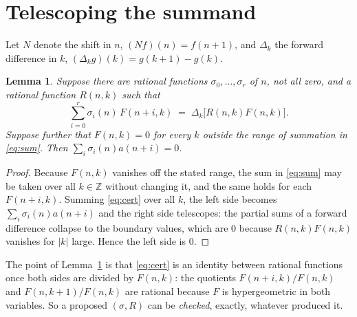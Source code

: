 \documentclass[11pt,a4paper]{article}
\theoremstyle{plain}
\newtheorem{lemma}[theorem]{Lemma}
\theoremstyle{definition}
\begin{document}
\section{Telescoping the summand}

Let $N$ denote the shift in $n$, $(Nf)(n)=f(n+1)$, and $\Delta_{k}$ the forward difference
in $k$, $(\Delta_{k}g)(k)=g(k+1)-g(k)$.

\begin{lemma}\label{lem:tel}
Suppose there are rational functions $\sigma_{0},\dots,\sigma_{r}$ of $n$, not all zero,
and a rational function $R(n,k)$ such that
\begin{equation}\label{eq:cert}
\sum_{i=0}^{r}\sigma_{i}(n)\,F(n+i,k)\;=\;\Delta_{k}\bigl[R(n,k)F(n,k)\bigr].
\end{equation}
Suppose further that $F(n,k)=0$ for every $k$ outside the range of summation in
\eqref{eq:sum}. Then $\sum_{i}\sigma_{i}(n)a(n+i)=0$.
\end{lemma}

\begin{proof}
Because $F(n,k)$ vanishes off the stated range, the sum in \eqref{eq:sum} may be taken
over all $k\in\mathbb{Z}$ without changing it, and the same holds for each $F(n+i,k)$.
Summing \eqref{eq:cert} over all $k$, the left side becomes
$\sum_{i}\sigma_{i}(n)a(n+i)$ and the right side telescopes: the partial sums of a forward
difference collapse to the boundary values, which are $0$ because $R(n,k)F(n,k)$ vanishes
for $|k|$ large. Hence the left side is $0$.
\end{proof}

The point of Lemma~\ref{lem:tel} is that \eqref{eq:cert} is an identity between rational
functions once both sides are divided by $F(n,k)$: the quotients $F(n+i,k)/F(n,k)$ and
$F(n,k+1)/F(n,k)$ are rational because $F$ is hypergeometric in both variables. So a
proposed $(\sigma,R)$ can be \emph{checked}, exactly, whatever produced it.
\end{document}
